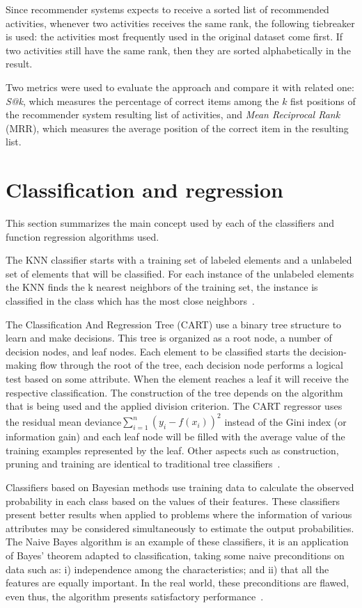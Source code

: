 \documentclass{sig-alternate-05-2015}
\begin{document}
Since recommender systems expects to receive a sorted list of recommended activities, whenever two activities receives the same rank, the following tiebreaker is used: the activities most frequently used in the original dataset come first. If two activities still have the same rank, then they are sorted alphabetically in the result.

Two metrics were used to evaluate the approach and compare it with related one: \emph{S@k}, which measures the percentage of correct items among the $k$ fist positions of the recommender system resulting list of activities, and \emph{Mean Reciprocal Rank} (MRR), which measures the average position of the correct item in the resulting list.

\section{Classification and regression}\label{TECNICAS}
This section summarizes the main concept used by each of the classifiers and function regression algorithms used.

The KNN classifier starts with a training set of labeled elements and a unlabeled set of elements that will be classified. For each instance of the unlabeled elements the KNN finds the k nearest neighbors of the training set, the instance is classified in the class which has the most close neighbors~\cite{MachineLearningwithR2013}.

The Classification And Regression Tree (CART) use a binary tree structure to learn and make decisions. This tree is organized as a root node, a number of decision nodes, and leaf nodes. Each element to be classified starts the decision-making flow through the root of the tree, each decision node performs a logical test based on some attribute. When the element reaches a leaf it will receive the respective classification. The construction of the tree depends on the algorithm that is being used and the applied division criterion. The CART regressor uses the residual mean deviance\(\sum\limits_{i = 1}^{n}(y_{i} - f(x_{i}))^{2}\) instead of the Gini index (or information gain) and each leaf node will be filled with the average value of the training examples represented by the leaf. Other aspects such as construction, pruning and training are identical to traditional tree classifiers~\cite{Connor2007}.

Classifiers based on Bayesian methods use training data to calculate the observed probability in each class based on the values of their features. These classifiers present better results when applied to problems where the information of various attributes may be considered simultaneously to estimate the output probabilities. The Naive Bayes algorithm is an example of these classifiers, it is an application of Bayes' theorem adapted to classification, taking some naive preconditions on data such as: i) independence among the characteristics; and ii) that all the features are equally important. In the real world, these preconditions are flawed, even thus, the algorithm presents satisfactory performance~\cite{MachineLearningwithR2013}.
\end{document}
